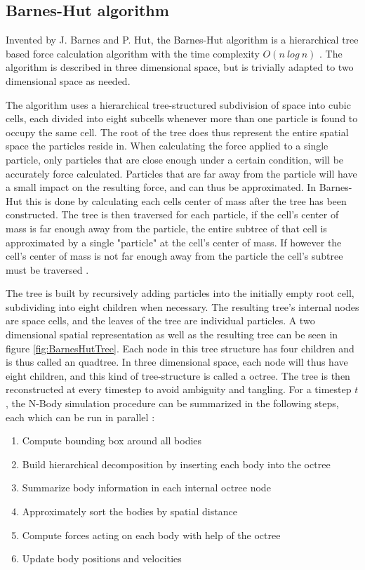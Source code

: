 \subsection{Barnes-Hut algorithm} \label{subsec:BarnesHut}
Invented by J. Barnes and P. Hut, the Barnes-Hut algorithm is a hierarchical tree based force calculation algorithm with the time complexity $O(n \ log \ n)$ \cite{barnes1986hierarchical}. The algorithm is described in three dimensional space, but is trivially adapted to two dimensional space as needed. 

The algorithm uses a hierarchical tree-structured subdivision of space into cubic cells, each divided into eight subcells whenever more than one particle is found to occupy the same cell. The root of the tree does thus represent the entire spatial space the particles reside in. When calculating the force applied to a single particle, only particles that are close enough under a certain condition, will be accurately force calculated. Particles that are far away from the particle will have a small impact on the resulting force, and can thus be approximated. In Barnes-Hut this is done by calculating each cells center of mass after the tree has been constructed. The tree is then traversed for each particle, if the cell's center of mass is far enough away from the particle, the entire subtree of that cell is approximated by a single "particle" at the cell's center of mass. If however the cell's center of mass is not far enough away from the particle the cell's subtree must be traversed \cite{singh1995load}. 

The tree is built by recursively adding particles into the initially empty root cell, subdividing into eight children when necessary. The resulting tree's internal nodes are space cells, and the leaves of the tree are individual particles. A two dimensional spatial representation as well as the resulting tree can be seen in figure \ref{fig:BarnesHutTree}. Each node in this tree structure has four children and is thus called an quadtree. In three dimensional space, each node will thus have eight children, and this kind of tree-structure is called a octree.
The tree is then reconstructed at every timestep to avoid ambiguity and tangling. For a timestep $t$, the N-Body simulation procedure can be summarized in the following steps, each which can be run in parallel \cite{burtscher2011efficient}:

\begin{enumerate}
    \item Compute bounding box around all bodies
    \item Build hierarchical decomposition by inserting each body into the octree
    \item Summarize body information in each internal octree node
    \item Approximately sort the bodies by spatial distance
    \item Compute forces acting on each body with help of the octree
    \item Update body positions and velocities
\end{enumerate}


